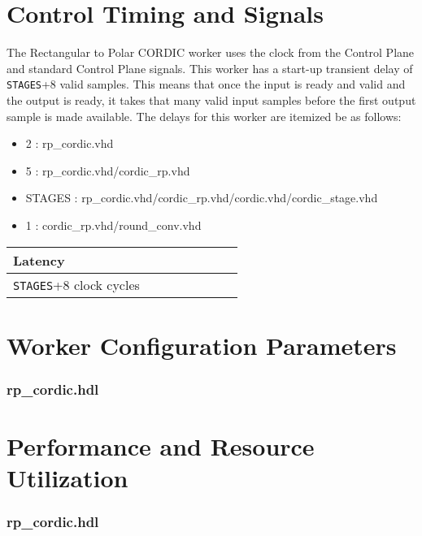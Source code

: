 \documentclass{article}
\def\comp{rp\_cordic}
\edef\ecomp{rp_cordic}
\begin{document}
\section*{Control Timing and Signals}
The Rectangular to Polar CORDIC worker uses the clock from the Control Plane and standard Control Plane signals. This worker has a start-up transient delay of \verb+STAGES++8 valid samples. This means that once the input is ready and valid and the output is ready, it takes that many valid input samples before the first output sample is made available. The delays for this worker are itemized be as follows:
\begin{itemize}
	\item 2 : rp\_cordic.vhd
	\item 5 : rp\_cordic.vhd/cordic\_rp.vhd
	\item STAGES : rp\_cordic.vhd/cordic\_rp.vhd/cordic.vhd/cordic\_stage.vhd 
	\item 1 : cordic\_rp.vhd/round\_conv.vhd
\end{itemize}

\begin{tabular}{|M{4.5cm}|M{1cm}|M{1cm}|M{1.5cm}|M{2cm}|M{1cm}|M{1cm}|M{2.5cm}|}
	\hline
	Latency                      \\
	\hline
	\verb+STAGES++8 clock cycles \\
	\hline
\end{tabular}

\begin{landscape}
\section*{Worker Configuration Parameters}
\subsubsection*{\comp.hdl}
%
\section*{Performance and Resource Utilization}
\subsubsection*{\comp.hdl}
%
\end{landscape}
\end{document}
